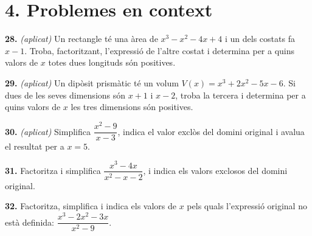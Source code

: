 \documentclass[13pt,a4paper]{extarticle}
\begin{document}
\section*{4. Problemes en context}

\par\noindent\begin{minipage}{\linewidth}
\textbf{28.} \emph{(aplicat)} Un rectangle té una àrea de $x^3-x^2-4x+4$ i un dels costats fa $x-1$. Troba, factoritzant, l'expressió de l'altre costat i determina per a quins valors de $x$ totes dues longituds són positives.\par
\end{minipage}\par\vspace{1.6mm}
\par\noindent\begin{minipage}{\linewidth}
\textbf{29.} \emph{(aplicat)} Un dipòsit prismàtic té un volum $V(x)=x^3+2x^2-5x-6$. Si dues de les seves dimensions són $x+1$ i $x-2$, troba la tercera i determina per a quins valors de $x$ les tres dimensions són positives.\par
\end{minipage}\par\vspace{1.6mm}
\par\noindent\begin{minipage}{\linewidth}
\textbf{30.} \emph{(aplicat)} Simplifica $\dfrac{x^2-9}{x-3}$, indica el valor exclòs del domini original i avalua el resultat per a $x=5$.\par
\end{minipage}\par\vspace{1.6mm}
\par\noindent\begin{minipage}{\linewidth}
\textbf{31.} Factoritza i simplifica $\dfrac{x^3-4x}{x^2-x-2}$, i indica els valors exclosos del domini original.\par
\end{minipage}\par\vspace{1.6mm}
\par\noindent\begin{minipage}{\linewidth}
\textbf{32.} Factoritza, simplifica i indica els valors de $x$ pels quals l'expressió original no està definida: $\dfrac{x^3-2x^2-3x}{x^2-9}$.\par
\end{minipage}\par\vspace{1.6mm}
\end{document}
